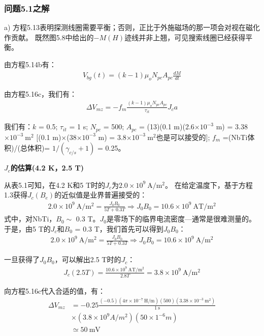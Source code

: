 \subsubsection{问题5.1之解}
a) 方程5.13表明探测线圈需要平衡；否则，正比于外施磁场的那一项会对视在磁化作贡献。
既然图5.8中给出的$−M(H)$迹线并非上翘，可见搜索线圈已经获得平衡。

由方程5.14b有：
\begin{align*}%
V_{bg}(t)=(k-1)\mu_{o}N_{pc}A_{pc}\frac{dM}{dt}\tag{5.14b}
\end{align*}

由方程5.16c，我们有：
\begin{align*}%
\Delta V_{mz}=-f_{m}\frac{(k-1)\mu_{o}N_{pc}A_{pc}}{\tau_{it}}J_{c}a\tag{5.16c}
\end{align*}

我们有：$k$ = 0.5; $\tau_{it}$ = 1 s; $N_{pc}$ = 500; $A_{pc}$ = (13)(0.1 m)(2.6$\times 10^{−3}$ m) = 3.38$\times 10^{−3}\ \mathrm{m^2}$ 
[(0.1 m)$\times$(38$\times 10^{−3}$ m) = 3.8$\times 10^{−3}\ \mathrm{m^2}$也是可以接受的]; $f_m$ =(NbTi体积)/(总体积)= $1/(\gamma_{c/s} + 1)$ = 0.25。

\textbf{$J_c$的估算(4.2 K，2.5 T)}

从表5.1可知，在4.2 K和5 T时的$J_c$为$2.0\times 10^9\ \mathrm{A/m^2}$。
在给定温度下，基于方程1.3获得$J_c(B_e)$的近似值是业界普遍接受的：
\begin{align*}%
2.0\times10^{9}\ \mathrm{A/m^{2}}=\frac{J_{0}B_{0}}{5T+0.3T}\Rightarrow J_{0}B_{0}=10.6\times 10^{9}\ \mathrm{AT/m^{2}} \tag{S1.1}
\end{align*}
式中，对NbTi，$B_0\sim$ 0.3 T。$J_0$是零场下的临界电流密度---通常是很难测量的。
于是，由5 T的$J_c$和$B_0$ = 0.3 T，我们首先可以得到$J_0 B_0$：
\begin{align*}%
2.0\times 10^{9}\ \mathrm{A/m^{2}}=\frac{J_{0}B_{0}}{5T+0.3T}\Rightarrow J_{0}B_{0}=10.6\times 10^{9}\ \mathrm{A/m^{2}}
\end{align*}

一旦获得了$J_0 B_0$，可以解出2.5 T时的$J_c$：
\begin{align*}%
J_{c}(2.5T)=\frac{10.6\times10^{9}\ \mathrm{AT/m^{2}}}{2.8T}=3.8\times 10^{9}\ \mathrm{A/m^{2}}
\end{align*}

向方程5.16c代入合适的值，有：
\begin{align*}%
\Delta V_{mz}&=-0.25\frac{(-0.5)(4\pi\times 10^{-7}\ \mathrm{H/m})(500)(3.38\times 10^{-3}\ \mathrm{m^{2}})}{1\ \mathrm{s}}\\
&\times(3.8\times 10^{9} A/m^{2})(50\times 1^{-6} m)\\
&\simeq 50\ \mathrm{mV}
\end{align*}

